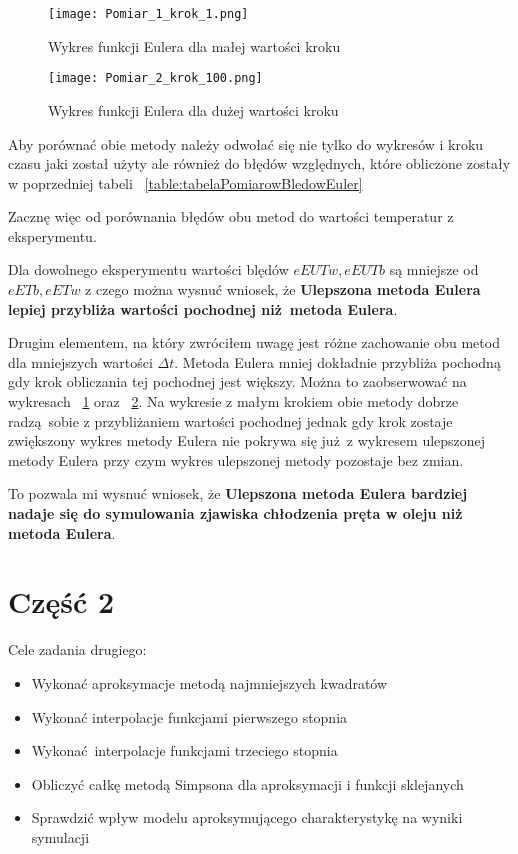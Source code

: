 \documentclass[varwidth,12pt,a4paper]{article}
\begin{document}
\begin{figure}
    \texttt{[image: Pomiar\_1\_krok\_1.png]}
    \caption{Wykres funkcji Eulera dla małej wartości kroku}
    \label{fig:wykresEulerMalyKrok}
\end{figure}
\begin{figure}
    \texttt{[image: Pomiar\_2\_krok\_100.png]} 
    \caption{Wykres funkcji Eulera dla dużej wartości kroku}
    \label{fig:wykresEulerDuzyKrok}
\end{figure}

Aby porównać obie metody należy odwołać się nie tylko do wykresów i kroku czasu jaki został użyty ale również
do błędów względnych, które obliczone zostały w poprzedniej tabeli ~\ref{table:tabelaPomiarowBledowEuler}

Zacznę więc od porównania błędów obu metod do wartości temperatur z eksperymentu.

Dla dowolnego eksperymentu wartości blędów $eEUTw, eEUTb$ są mniejsze od $eETb, eETw$ z czego można wysnuć wniosek,
że \textbf{Ulepszona metoda Eulera lepiej przybliża wartości pochodnej niż metoda Eulera}.

Drugim elementem, na który zwróciłem uwagę jest różne zachowanie obu metod dla mniejszych wartości $\Delta t$.
Metoda Eulera mniej dokładnie przybliża pochodną gdy krok obliczania tej pochodnej jest większy. Można to 
zaobserwować na wykresach ~\ref{fig:wykresEulerMalyKrok} oraz ~\ref{fig:wykresEulerDuzyKrok}.
Na wykresie z małym krokiem obie metody dobrze radzą sobie z przybliżaniem wartości pochodnej jednak gdy
krok zostaje zwiększony wykres metody Eulera nie pokrywa się już z wykresem ulepszonej metody Eulera przy czym
wykres ulepszonej metody pozostaje bez zmian.

To pozwala mi wysnuć wniosek, że \textbf{Ulepszona metoda Eulera bardziej nadaje się do symulowania zjawiska chłodzenia
pręta w oleju niż metoda Eulera}.

\section{Część 2}

Cele zadania drugiego:

\begin{itemize}
  \item Wykonać aproksymacje metodą najmniejszych kwadratów
  \item Wykonać interpolacje funkcjami pierwszego stopnia
  \item Wykonać interpolacje funkcjami trzeciego stopnia
  \item Obliczyć całkę metodą Simpsona dla aproksymacji i funkcji sklejanych
  \item Sprawdzić wpływ modelu aproksymującego charakterystykę na wyniki symulacji
\end{itemize}
\end{document}
